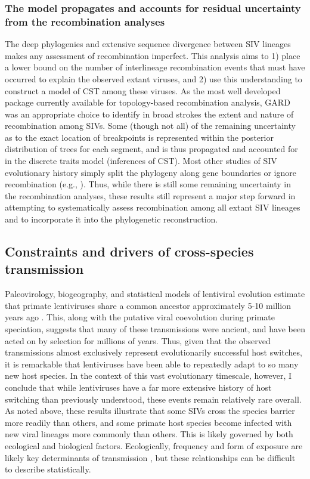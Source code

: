 \subsubsection*{The model propagates and accounts for residual uncertainty from the recombination analyses}
The deep phylogenies and extensive sequence divergence between SIV lineages makes any assessment of recombination imperfect.
This analysis aims to 1) place a lower bound on the number of interlineage recombination events that must have occurred to explain the observed extant viruses, and 2) use this understanding to construct a model of CST among these viruses.
As the most well developed package currently available for topology-based recombination analysis, GARD was an appropriate choice to identify in broad strokes the extent and nature of recombination among SIVs.
Some (though not all) of the remaining uncertainty as to the exact location of breakpoints is represented within the posterior distribution of trees for each segment, and is thus propagated and accounted for in the discrete traits model (inferences of CST).
Most other studies of SIV evolutionary history simply split the phylogeny along gene boundaries or ignore recombination (e.g., \citep{bailes2003hybrid,charleston2002preferential,sharp2011origins}).
Thus, while there is still some remaining uncertainty in the recombination analyses, these results still represent a major step forward in attempting to systematically assess recombination among all extant SIV lineages and to incorporate it into the phylogenetic reconstruction.

\subsection{Constraints and drivers of cross-species transmission}
Paleovirology, biogeography, and statistical models of lentiviral evolution estimate that primate lentiviruses share a common ancestor approximately 5-10 million years ago \citep{aiewsakun2016time,compton2013convergence,mccarthy2015evolutionary,worobey2010island}.
This, along with the putative viral coevolution during primate speciation, suggests that many of these transmissions were ancient, and have been acted on by selection for millions of years.
Thus, given that the observed transmissions almost exclusively represent evolutionarily successful host switches, it is remarkable that lentiviruses have been able to repeatedly adapt to so many new host species.
In the context of this vast evolutionary timescale, however, I conclude that while lentiviruses have a far more extensive history of host switching than previously understood, these events remain relatively rare overall.
As noted above, these results illustrate that some SIVs cross the species barrier more readily than others, and some primate host species become infected with new viral lineages more commonly than others.
This is likely governed by both ecological and biological factors.
Ecologically, frequency and form of exposure are likely key determinants of transmission \citep{locatelli2012cross}, but these relationships can be difficult to describe statistically.

